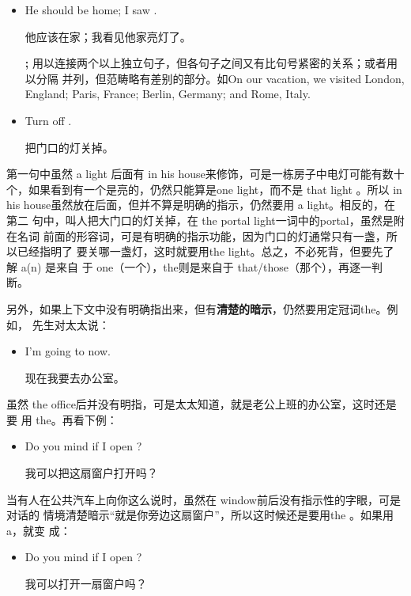 \begin{itemize}
\item  He should be home; I saw .

他应该在家；我看见他家亮灯了。

\textbf{;} 用以连接两个以上独立句子，但各句子之间又有比句号紧密的关系；或者用以分隔
并列，但范畴略有差别的部分。如On our vacation, we visited London, England;
Paris, France; Berlin, Germany; and Rome, Italy.

\item  Turn off .

把门口的灯关掉。
\end{itemize}

第一句中虽然 a light 后面有 in his house来修饰，可是一栋房子中电灯可能有数十
个，如果看到有一个是亮的，仍然只能算是one light，而不是 that light 。所以 in
his house虽然放在后面，但并不算是明确的指示，仍然要用 a light。相反的，在第二
句中，叫人把大门口的灯关掉，在 the portal light一词中的portal，虽然是附在名词
前面的形容词，可是有明确的指示功能，因为门口的灯通常只有一盏，所以已经指明了
要关哪一盏灯，这时就要用the light。总之，不必死背，但要先了解 a(n) 是来自
于 one（一个），the则是来自于 that/those（那个），再逐一判断。

另外，如果上下文中没有明确指出来，但有\textbf{清楚的暗示}，仍然要用定冠词the。例如，
先生对太太说：

\begin{itemize}
\item  I'm going to  now.

  现在我要去办公室。
\end{itemize}

虽然 the office后并没有明指，可是太太知道，就是老公上班的办公室，这时还是要
用 the。再看下例：

\begin{itemize}
\item  Do you mind if I open ?

  我可以把这扇窗户打开吗？
\end{itemize}

当有人在公共汽车上向你这么说时，虽然在 window前后没有指示性的字眼，可是对话的
情境清楚暗示“就是你旁边这扇窗户”，所以这时候还是要用the 。如果用 a，就变
成：

\begin{itemize}
\item  Do you mind if I open ?

  我可以打开一扇窗户吗？
\end{itemize}

